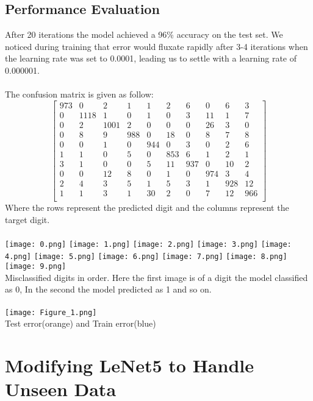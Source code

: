 \documentclass{article}
\begin{document}
\subsection{Performance Evaluation}
After 20 iterations the model achieved a 96\% accuracy on the test set. We noticed during training that error would fluxate rapidly after 3-4 iterations when the learning rate was set to 0.0001, leading us to settle with a learning rate of 0.000001.\\~\\The confusion matrix is given as follow:
$$
\begin{bmatrix}
973&0&2&1&1&2&6&0&6&3\\
0&1118&1&0&1&0&3&11&1&7\\
0&2&1001&2&0&0&0&26&3&0\\
0&8&9&988&0&18&0&8&7&8\\
0&0&1&0&944&0&3&0&2&6\\
1&1&0&5&0&853&6&1&2&1\\
3&1&0&0&5&11&937&0&10&2\\
0&0&12&8&0&1&0&974&3&4\\
2&4&3&5&1&5&3&1&928&12\\
1&1&3&1&30&2&0&7&12&966\\
\end{bmatrix}
$$
Where the rows represent the predicted digit and the columns represent the target digit.\\~\\{\centering
   {\texttt{[image: 0.png]}} 
   {\texttt{[image: 1.png]}} 
    {\texttt{[image: 2.png]}}
    {\texttt{[image: 3.png]}}
    {\texttt{[image: 4.png]}}
      {\texttt{[image: 5.png]}}
        {\texttt{[image: 6.png]}}
          {\texttt{[image: 7.png]}}
            {\texttt{[image: 8.png]}}
              {\texttt{[image: 9.png]}}\\
              Misclassified digits in order. Here the first image is of a digit the model classified as 0, In the second the model predicted as 1 and so on.\\~\\
    \label{fig:foobar}
    {\texttt{[image: Figure\_1.png]}}\\
    Test error(orange) and Train error(blue)}
    
\section{Modifying LeNet5 to Handle Unseen Data}
\end{document}
